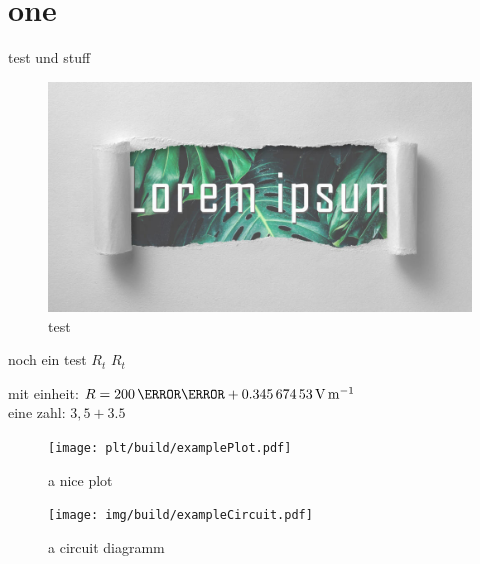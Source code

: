 \documentclass[11pt,a4paper,twoside,f1,ngerman]{HsH-report}
\begin{document}
\maketitle
\declarationAuthorship

\begin{abstract}
	\lipsum[5-8]
\end{abstract}

\tableofcontents

\cleardoublepage %

\chapter{one}
	\label{chap: one}
	{\color{red}test} und stuff
	\begin{figure}
		\centering
		\includegraphics[width=.6\textwidth]{img/lorem-ipsum.jpg}
		\caption{test}
	\end{figure}

	noch ein test \normalsubscripts$R_t$ \upsubscripts$R_t$

	mit einheit: $R=200\,\milli\ohm+ \SI{0.34567453}{\volt\per\metre}$
	\cite{laboranleitung:physik}
	\vspace{2cm}\\\pagebreak
	eine zahl: $3,5+3.5$\\

	\begin{figure}
		\centering
		\texttt{[image: plt/build/examplePlot.pdf]}
		\caption{a nice plot}
	\end{figure}

	\begin{figure}
		\centering
		\texttt{[image: img/build/exampleCircuit.pdf]}
		\caption{a circuit diagramm}
	\end{figure}

\printbibliography
\listoffigures
\end{document}
